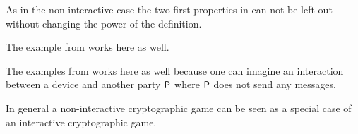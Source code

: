 As in the non-interactive case the two first properties in  can not be left out without changing the power of the definition. 

\begin{ex}
The example from  works here as well. 
\end{ex}

\begin{ex}
The examples from  works here as well because one can imagine an interaction between a device and another party $\mathsf{P}$ where $\mathsf{P}$ does not send any messages.
\end{ex}

In general a non-interactive cryptographic game can be seen as a special case of an interactive cryptographic game. 

\begin{comment}
As in the non-interactive case we can give a separating example for weak and strong undetectability. 

\begin{ex}
Hmm?\fxnote{Need this}
\end{ex}
 \end{comment}
